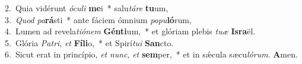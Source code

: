 {2.~}Quia vidérunt \textit{ó}\textit{cu}\textit{li} \textbf{me}i~* salu\textit{tá}\textit{re} \textbf{tu}um,\\
{3.~}\textit{Quod} \textit{pa}\textbf{rá}sti~* ante fáciem ómnium \textit{po}\textit{pu}\textbf{ló}rum,\\
{4.~}Lumen ad revela\textit{ti}\textit{ó}\textit{nem} \textbf{Gén}\textbf{ti}um,~* et glóriam plebis \textit{tu}\textit{æ} \textbf{Is}\textbf{ra}ël.\\
{5.~}Glória \textit{Pa}\textit{tri}, \textit{et} \textbf{Fí}\textbf{li}o,~* et Spirí\textit{tu}\textit{i} \textbf{San}cto.\\
{6.~}Sicut erat in princípio, \textit{et} \textit{nunc}, \textit{et} \textbf{sem}per,~* et in sǽcula sæcu\textit{ló}\textit{rum}. \textbf{A}men.\\
